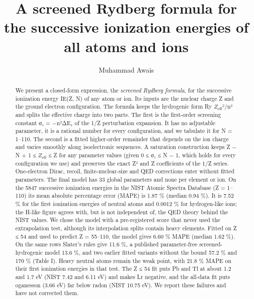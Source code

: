 \documentclass[aps,pra,preprint,notitlepage,superscriptaddress,amsmath,amssymb]{revtex4-2}
\begin{document}
\linenumbers
\title{A screened Rydberg formula for the successive ionization energies of all atoms and ions}
\author{Muhammad Awais}
\begin{abstract}
We present a closed-form expression, the \emph{screened Rydberg formula}, for the successive ionization energy IE(Z, N) of any atom or ion. Its inputs are the nuclear charge Z and the ground electron configuration. The formula keeps the hydrogenic form Ry $Z_{\mathrm{eff}}$²/n² and splits the effective charge into two parts. The first is the first-order screening constant σ₁ = −n²ΔE₁ of the 1/Z perturbation expansion. It has no adjustable parameter, it is a rational number for every configuration, and we tabulate it for N = 1–110. The second is a fitted higher-order remainder that depends on the ion charge and varies smoothly along isoelectronic sequences. A saturation construction keeps Z − N + 1 ≤ $Z_{\mathrm{eff}}$ ≤ Z for any parameter values (given 0 ≤ σ₁ ≤ N − 1, which holds for every configuration we use) and preserves the exact Z² and Z coefficients of the 1/Z series. One-electron Dirac, recoil, finite-nuclear-size and QED corrections enter without fitted parameters. The final model has 33 global parameters and none per element or ion. On the 5847 successive ionization energies in the NIST Atomic Spectra Database (Z = 1–110) its mean absolute percentage error (MAPE) is 1.87 \% (median 0.94 \%). It is 7.52 \% for the first ionization energies of neutral atoms and 0.0012 \% for hydrogen-like ions; the H-like figure agrees with, but is not independent of, the QED theory behind the NIST values. We chose the model with a pre-registered score that never used the extrapolation test, although its interpolation splits contain heavy elements. Fitted on Z ≤ 54 and used to predict Z = 55–110, the model gives 6.60 \% MAPE (median 1.62 \%). On the same rows Slater's rules give 11.6 \%, a published parameter-free screened-hydrogenic model 13.6 \%, and two earlier fitted variants without the bound 57.2 \% and 170 \% (Table I). Heavy neutral atoms remain the weak point, with 21.8 \% MAPE on their first ionization energies in that test. The Z ≤ 54 fit puts Pb and Tl at about 1.2 and 1.7 eV (NIST 7.42 and 6.11 eV) and makes Lr negative, and the all-data fit puts oganesson (3.66 eV) far below radon (NIST 10.75 eV). We report these failures and have not corrected them.
\end{abstract}
\maketitle
\end{document}
